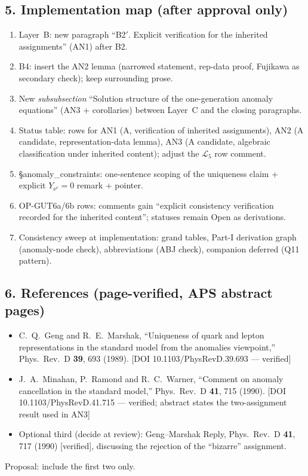 \subsection*{5. Implementation map (after approval only)}
\begin{enumerate}
  \item Layer~B: new paragraph ``B2$'$. Explicit verification for
    the inherited assignments'' (AN1) after B2.
  \item B4: insert the AN2 lemma (narrowed statement, rep-data
    proof, Fujikawa as secondary check); keep surrounding prose.
  \item New \emph{subsubsection}
    ``Solution structure of the one-generation anomaly equations''
    (AN3 + corollaries) between Layer~C and the closing paragraphs.
  \item Status table: rows for AN1 (A, verification of inherited
    assignments), AN2 (A candidate, representation-data lemma),
    AN3 (A candidate, algebraic classification under inherited
    content); adjust the $\mathcal L_5$ row comment.
  \item \S anomaly\_constraints: one-sentence scoping of the
    uniqueness claim + explicit $Y_{\nu^c}=0$ remark + pointer.
  \item OP-GUT6a/6b rows: comments gain ``explicit consistency
    verification recorded for the inherited content''; statuses
    remain Open as derivations.
  \item Consistency sweep at implementation: grand tables, Part-I
    derivation graph (anomaly-node check), abbreviations (ABJ
    check), companion deferred (Q11 pattern).
\end{enumerate}

\subsection*{6. References (page-verified, APS abstract pages)}
\begin{itemize}
  \item C.~Q.~Geng and R.~E.~Marshak, ``Uniqueness of quark and
    lepton representations in the standard model from the anomalies
    viewpoint,'' Phys.\ Rev.\ D \textbf{39}, 693 (1989).
    [DOI 10.1103/PhysRevD.39.693 --- verified]
  \item J.~A.~Minahan, P.~Ramond and R.~C.~Warner, ``Comment on
    anomaly cancellation in the standard model,'' Phys.\ Rev.\ D
    \textbf{41}, 715 (1990).
    [DOI 10.1103/PhysRevD.41.715 --- verified; abstract states the
    two-assignment result used in AN3]
  \item Optional third (decide at review): Geng--Marshak Reply,
    Phys.\ Rev.\ D \textbf{41}, 717 (1990) [verified], discussing
    the rejection of the ``bizarre'' assignment.
\end{itemize}
Proposal: include the first two only.

